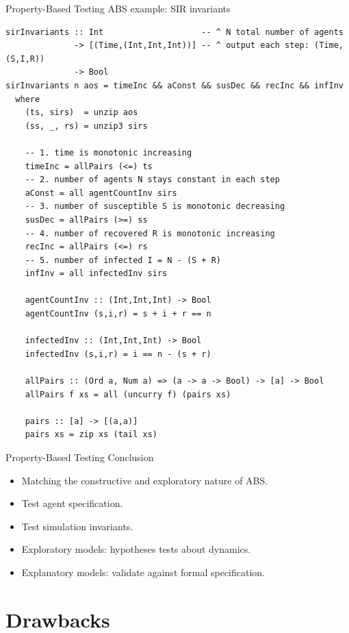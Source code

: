 \documentclass{beamer} %
\begin{document}
\begin{frame}[fragile]{Property-Based Testing ABS example: SIR invariants}
\begin{verbatim}
sirInvariants :: Int                    -- ^ N total number of agents
              -> [(Time,(Int,Int,Int))] -- ^ output each step: (Time, (S,I,R))
              -> Bool
sirInvariants n aos = timeInc && aConst && susDec && recInc && infInv
  where
    (ts, sirs)  = unzip aos
    (ss, _, rs) = unzip3 sirs

    -- 1. time is monotonic increasing
    timeInc = allPairs (<=) ts
    -- 2. number of agents N stays constant in each step
    aConst = all agentCountInv sirs
    -- 3. number of susceptible S is monotonic decreasing
    susDec = allPairs (>=) ss
    -- 4. number of recovered R is monotonic increasing
    recInc = allPairs (<=) rs
    -- 5. number of infected I = N - (S + R)
    infInv = all infectedInv sirs

    agentCountInv :: (Int,Int,Int) -> Bool
    agentCountInv (s,i,r) = s + i + r == n

    infectedInv :: (Int,Int,Int) -> Bool
    infectedInv (s,i,r) = i == n - (s + r)

    allPairs :: (Ord a, Num a) => (a -> a -> Bool) -> [a] -> Bool
    allPairs f xs = all (uncurry f) (pairs xs)

    pairs :: [a] -> [(a,a)]
    pairs xs = zip xs (tail xs)
\end{verbatim}
\end{frame}

\begin{frame}{Property-Based Testing Conclusion}
  \begin{itemize}
    \item Matching the constructive and exploratory nature of ABS.
    \item Test agent specification.
    \item Test simulation invariants.
    \item Exploratory models: hypotheses tests about dynamics.
    \item Explanatory models: validate against formal specification.
  \end{itemize}
\end{frame}

\section{Drawbacks}
\end{document}
